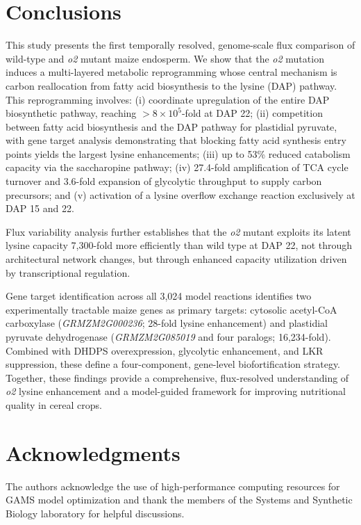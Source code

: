 \documentclass[12pt,a4paper]{article}
\begin{document}
\section{Conclusions}

This study presents the first temporally resolved, genome-scale flux comparison of wild-type and \textit{o2} mutant maize endosperm. We show that the \textit{o2} mutation induces a multi-layered metabolic reprogramming whose central mechanism is carbon reallocation from fatty acid biosynthesis to the lysine (DAP) pathway. This reprogramming involves: (i) coordinate upregulation of the entire DAP biosynthetic pathway, reaching $>8 \times 10^{5}$-fold at DAP 22; (ii) competition between fatty acid biosynthesis and the DAP pathway for plastidial pyruvate, with gene target analysis demonstrating that blocking fatty acid synthesis entry points yields the largest lysine enhancements; (iii) up to 53\% reduced catabolism capacity via the saccharopine pathway; (iv) 27.4-fold amplification of TCA cycle turnover and 3.6-fold expansion of glycolytic throughput to supply carbon precursors; and (v) activation of a lysine overflow exchange reaction exclusively at DAP 15 and 22.

Flux variability analysis further establishes that the \textit{o2} mutant exploits its latent lysine capacity 7,300-fold more efficiently than wild type at DAP 22, not through architectural network changes, but through enhanced capacity utilization driven by transcriptional regulation.

Gene target identification across all 3,024 model reactions identifies two experimentally tractable maize genes as primary targets: cytosolic acetyl-CoA carboxylase (\textit{GRMZM2G000236}; 28-fold lysine enhancement) and plastidial pyruvate dehydrogenase (\textit{GRMZM2G085019} and four paralogs; 16,234-fold). Combined with DHDPS overexpression, glycolytic enhancement, and LKR suppression, these define a four-component, gene-level biofortification strategy. Together, these findings provide a comprehensive, flux-resolved understanding of \textit{o2} lysine enhancement and a model-guided framework for improving nutritional quality in cereal crops.

\section*{Acknowledgments}

The authors acknowledge the use of high-performance computing resources for GAMS model optimization and thank the members of the Systems and Synthetic Biology laboratory for helpful discussions.
\end{document}
